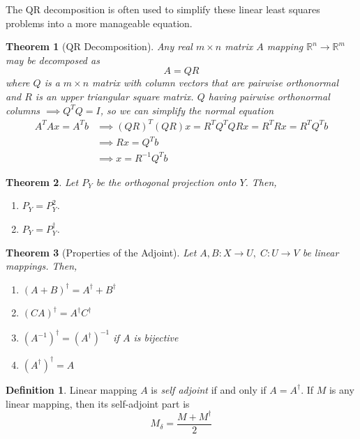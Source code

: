 \documentclass{article}
\newtheorem{theorem}{Theorem}[section]
\theoremstyle{remark}
\theoremstyle{definition}
\newtheorem{definition}{Definition}[section]
\begin{document}
    The QR decomposition is often used to simplify these linear least squares problems into a more manageable equation. 

    \begin{theorem}[QR Decomposition]
    Any real $m \times n$ matrix $A$ mapping $\mathbb{R}^n \longrightarrow \mathbb{R}^m$ may be decomposed as
    \[A = Q R\] 
    where $Q$ is a $m \times n$ matrix with column vectors that are pairwise orthonormal and $R$ is an upper triangular square matrix. $Q$ having pairwise orthonormal columns $\implies Q^T Q = I$, so we can simplify the normal equation
    \begin{align*}
        A^T A x = A^T b & \implies (Q R)^T (Q R) x = R^T Q^T Q R x = R^T R x = R^T Q^T b \\
        & \implies R x = Q^T b \\
        & \implies x = R^{-1} Q^T b
    \end{align*}
    \end{theorem}

    \begin{theorem}
    Let $P_Y$ be the orthogonal projection onto $Y$. Then, 
    \begin{enumerate}
        \item $P_Y = P_Y^2$. 
        \item $P_Y = P_Y^\dagger$. 
    \end{enumerate}
    \end{theorem}

    \begin{theorem}[Properties of the Adjoint] Let $A, B: X \longrightarrow U, \; C: U \longrightarrow V$ be linear mappings. Then, 
    \begin{enumerate}
        \item $(A + B)^\dagger = A^\dagger + B^\dagger$
        \item $(C A)^\dagger = A^\dagger C^\dagger$
        \item $(A^{-1})^\dagger = (A^\dagger)^{-1}$ if $A$ is bijective
        \item $(A^\dagger)^\dagger = A$
    \end{enumerate}
    \end{theorem}

    \begin{definition}
    Linear mapping $A$ is \textit{self adjoint} if and only if $A = A^\dagger$. If $M$ is any linear mapping, then its self-adjoint part is 
    \[M_\delta = \frac{M + M^\dagger}{2}\]
    \end{definition}
\end{document}
